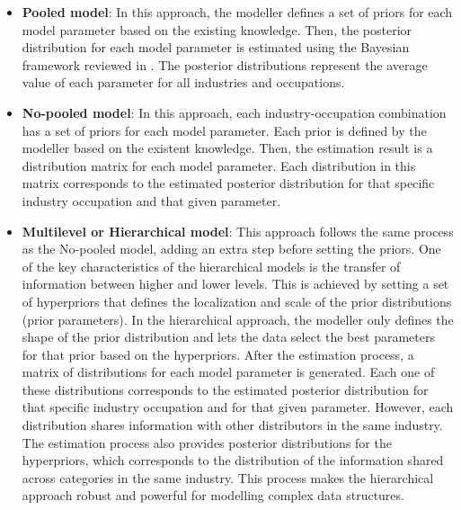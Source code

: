 \begin{itemize}
    \item \textbf{Pooled model}: In this approach, the modeller defines a set of priors for each model parameter based on the existing knowledge. Then, the posterior distribution for each model parameter is estimated using the Bayesian framework reviewed in . The posterior distributions represent the average value of each parameter for all industries and occupations. 

    \item \textbf{No-pooled model}: In this approach, each industry-occupation combination has a set of priors for each model parameter. Each prior is defined by the modeller based on the existent knowledge. Then, the estimation result is a distribution matrix for each model parameter. Each distribution in this matrix corresponds to the estimated posterior distribution for that specific industry occupation and that given parameter. 
    
    \item \textbf{Multilevel or Hierarchical model}: This approach follows the same process as the No-pooled model, adding an extra step before setting the priors. One of the key characteristics of the hierarchical models is the transfer of information between higher and lower levels. This is achieved by setting a set of hyperpriors that defines the localization and scale of the prior distributions (prior parameters). In the hierarchical approach, the modeller only defines the shape of the prior distribution and lets the data select the best parameters for that prior based on the hyperpriors. After the estimation process, a matrix of distributions for each model parameter is generated. Each one of these distributions corresponds to the estimated posterior distribution for that specific industry occupation and for that given parameter. However, each distribution shares information with other distributors in the same industry. The estimation process also provides posterior distributions for the hyperpriors, which corresponds to the distribution of the information shared across categories in the same industry. This process makes the hierarchical approach robust and powerful for modelling complex data structures.
\end{itemize}

